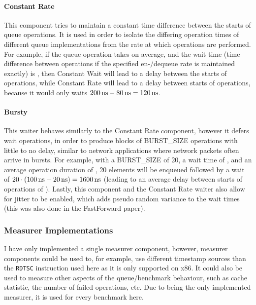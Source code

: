 \paragraph{Constant Rate}
This component tries to maintain a constant time difference between the starts of queue operations.
It is used in order to isolate the differing operation times of different queue implementations from the rate
at which operations are performed.
For example, if the queue operation takes  on average, and the wait time (time difference between
operations if the specified en-/dequeue rate is maintained exactly) is , then Constant Wait will lead
to a  delay between the starts of operations, while Constant Rate will lead to a  delay
between starts of operations, because it would only waits $\SI{200}{\nano\second}-\SI{80}{\nano\second}=\SI{120}{\nano\second}$.

\paragraph{Bursty}
This waiter behaves similarly to the Constant Rate component, however it defers wait operations, in order to
produce blocks of BURST\_SIZE operations with little to no delay, similar to network applications where
network packets often arrive in bursts.
For example, with a BURST\_SIZE of 20, a wait time of , and an average operation duration of ,
20 elements will be enqueued followed by a wait of $20\cdot(\SI{100}{\nano\second} - \SI{20}{\nano\second}) = \SI{1600}{\nano\second}$ (leading to an average
delay between starts of operations of ).
Lastly, this component and the Constant Rate waiter also allow for jitter to be enabled, which adds pseudo
random variance to the wait times (this was also done in the FastForward paper\cite{FastForward}).

\subsubsection{Measurer Implementations}
I have only implemented a single measurer component, however, measurer components could be used to, for
example, use different timestamp sources than the \texttt{RDTSC} instruction used here as it is only supported on x86.
It could also be used to measure other aspects of the queue/benchmark behaviour, such as cache statistic, the
number of failed operations, etc.
Due to being the only implemented measurer, it is used for every benchmark here.
